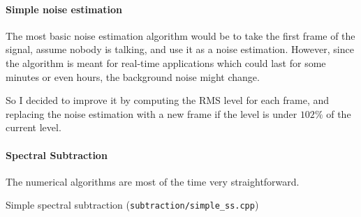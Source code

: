\paragraph{Simple noise estimation}
The most basic noise estimation algorithm would be to take the first frame of the signal, assume nobody is talking, and use it as a noise estimation.
However, since the algorithm is meant for real-time applications which could last for some minutes or even hours, the background noise might change.

So I decided to improve it by computing the \ac{RMS} level for each frame, and replacing the noise estimation with a new frame if the level is under $102\%$ of the current level.
\newpage
\paragraph{Spectral Subtraction}
The numerical algorithms are most of the time very straightforward.

\begin{algorithm}
 \SetAlgoLined

 \caption{Simple spectral subtraction (\texttt{subtraction/simple\_ss.cpp})}
\end{algorithm}

